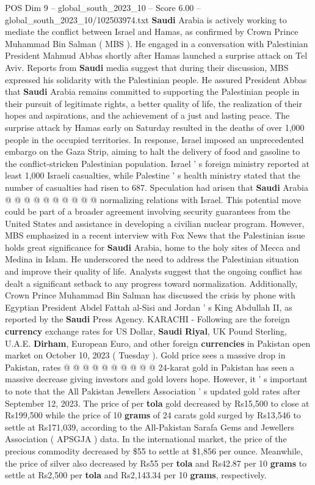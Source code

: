 \begin{textsample}{POS Dim 9 – global\_south\_2023\_10 – Score 6.00 – global\_south\_2023\_10/102503974.txt}  \label{ex:f9_pos_079}
\textbf{Saudi} Arabia is actively working to mediate the conflict between Israel and Hamas, as confirmed by Crown Prince Muhammad Bin Salman ( MBS ).
He engaged in a conversation with Palestinian President Mahmud Abbas shortly after Hamas launched a surprise attack on Tel Aviv.
Reports from \textbf{Saudi} media suggest that during their discussion, MBS expressed his solidarity with the Palestinian people.
He assured President Abbas that \textbf{Saudi} Arabia remains committed to supporting the Palestinian people in their pursuit of legitimate rights, a better quality of life, the realization of their hopes and aspirations, and the achievement of a just and lasting peace.
The surprise attack by Hamas early on Saturday resulted in the deaths of over 1,000 people in the occupied territories.
In response, Israel imposed an unprecedented embargo on the Gaza Strip, aiming to halt the delivery of food and gasoline to the conflict-stricken Palestinian population.
Israel ' s foreign ministry reported at least 1,000 Israeli casualties, while Palestine ' s health ministry stated that the number of casualties had risen to 687.
Speculation had arisen that \textbf{Saudi} Arabia @ @ @ @ @ @ @ @ @ @ normalizing relations with Israel.
This potential move could be part of a broader agreement involving security guarantees from the United States and assistance in developing a civilian nuclear program.
However, MBS emphasized in a recent interview with Fox News that the Palestinian issue holds great significance for \textbf{Saudi} Arabia, home to the holy sites of Mecca and Medina in Islam.
He underscored the need to address the Palestinian situation and improve their quality of life.
Analysts suggest that the ongoing conflict has dealt a significant setback to any progress toward normalization.
Additionally, Crown Prince Muhammad Bin Salman has discussed the crisis by phone with Egyptian President Abdel Fattah al-Sisi and Jordan ' s King Abdullah II, as reported by the \textbf{Saudi} Press Agency.
KARACHI - Following are the foreign \textbf{currency} exchange rates for US Dollar, \textbf{Saudi} \textbf{Riyal}, UK Pound Sterling, U.A.E. \textbf{Dirham}, European Euro, and other foreign \textbf{currencies} in Pakistan open market on October 10, 2023 ( Tuesday ).
Gold price sees a massive drop in Pakistan, rates @ @ @ @ @ @ @ @ @ @ 24-karat gold in Pakistan has seen a massive decrease giving investors and gold lovers hope.
However, it ' s important to note that the All Pakistan Jewellers Association ' s updated gold rates after September 12, 2023.
The price of per \textbf{tola} gold decreased by Rs15,500 to close at Rs199,500 while the price of 10 \textbf{grams} of 24 carats gold surged by Rs13,546 to settle at Rs171,039, according to the All-Pakistan Sarafa Gems and Jewellers Association ( APSGJA ) data.
In the international market, the price of the precious commodity decreased by \$55 to settle at \$1,856 per ounce.
Meanwhile, the price of silver also decreased by Rs55 per \textbf{tola} and Rs42.87 per 10 \textbf{grams} to settle at Rs2,500 per \textbf{tola} and Rs2,143.34 per 10 \textbf{grams}, respectively.

\end{textsample}
